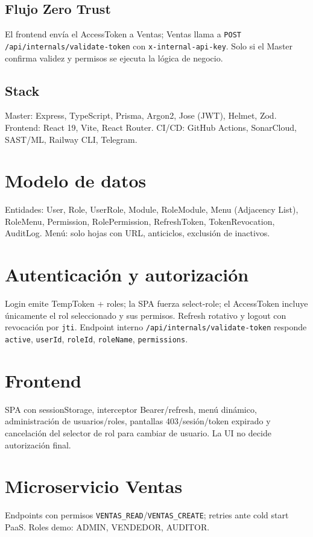 \subsection{Flujo Zero Trust}
El frontend envía el AccessToken a Ventas; Ventas llama a
\texttt{POST /api/internals/validate-token} con \texttt{x-internal-api-key}.
Solo si el Master confirma validez y permisos se ejecuta la lógica de negocio.

\subsection{Stack}
Master: Express, TypeScript, Prisma, Argon2, Jose (JWT), Helmet, Zod.
Frontend: React 19, Vite, React Router.
CI/CD: GitHub Actions, SonarCloud, SAST/ML, Railway CLI, Telegram.

\section{Modelo de datos}
Entidades: User, Role, UserRole, Module, RoleModule, Menu (Adjacency List),
RoleMenu, Permission, RolePermission, RefreshToken, TokenRevocation, AuditLog.
Menú: solo hojas con URL, anticiclos, exclusión de inactivos.

\section{Autenticación y autorización}
Login emite TempToken + roles; la SPA fuerza select-role; el AccessToken incluye
únicamente el rol seleccionado y sus permisos. Refresh rotativo y logout con
revocación por \texttt{jti}. Endpoint interno
\texttt{/api/internals/validate-token} responde
\texttt{active}, \texttt{userId}, \texttt{roleId}, \texttt{roleName}, \texttt{permissions}.

\section{Frontend}
SPA con sessionStorage, interceptor Bearer/refresh, menú dinámico, administración
de usuarios/roles, pantallas 403/sesión/token expirado y cancelación del selector
de rol para cambiar de usuario. La UI no decide autorización final.

\section{Microservicio Ventas}
Endpoints con permisos \texttt{VENTAS\_READ}/\texttt{VENTAS\_CREATE}; retries ante
cold start PaaS. Roles demo: ADMIN, VENDEDOR, AUDITOR.

